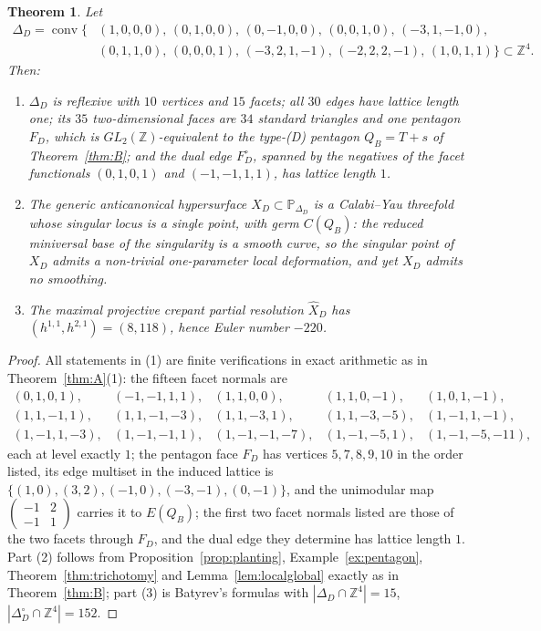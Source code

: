 \documentclass[11pt]{amsart}
\newtheorem{theorem}{Theorem}[section]
\theoremstyle{definition}
\theoremstyle{remark}
\newcommand{\ZZ}{\mathbb{Z}}
\newcommand{\PP}{\mathbb{P}}
\newcommand{\conv}{\operatorname{conv}}
\begin{document}
\begin{theorem}\label{thm:D}
Let
\begin{align*}
\Delta_D=\conv\{&(1,0,0,0),\,(0,1,0,0),\,(0,-1,0,0),\,(0,0,1,0),\,
(-3,1,-1,0),\\
&(0,1,1,0),\,(0,0,0,1),\,(-3,2,1,-1),\,(-2,2,2,-1),\,(1,0,1,1)\}
\subset\ZZ^4 .
\end{align*}
Then:
\begin{enumerate}
\item $\Delta_D$ is reflexive with $10$ vertices and $15$ facets; all $30$
edges have lattice length one; its $35$ two-dimensional faces are $34$
standard triangles and one pentagon $F_D$, which is
$GL_2(\ZZ)$-equivalent to the type-\textup{(D)} pentagon $Q_B = T + s$ of
Theorem~\textup{\ref{thm:B}}; and the dual edge $F_D^\circ$, spanned by the
negatives of the facet functionals $(0,1,0,1)$ and $(-1,-1,1,1)$, has
lattice length $1$.
\item The generic anticanonical hypersurface $X_D \subset \PP_{\Delta_D}$ is
a Calabi--Yau threefold whose singular locus is a \emph{single} point, with
germ $C(Q_B)$: the reduced miniversal base of the singularity is a smooth
curve, so the singular point of $X_D$ admits a non-trivial one-parameter
local deformation, and yet $X_D$ admits no smoothing.
\item The maximal projective crepant partial resolution $\widehat X_D$ has
$(h^{1,1},h^{2,1}) = (8,118)$, hence Euler number $-220$.
\end{enumerate}
\end{theorem}

\begin{proof}
All statements in (1) are finite verifications in exact arithmetic as in
Theorem~\ref{thm:A}(1): the fifteen facet normals are
\[
\begin{array}{lllll}
(0,1,0,1), & (-1,-1,1,1), & (1,1,0,0), & (1,1,0,-1), & (1,0,1,-1),\\[2pt]
(1,1,-1,1), & (1,1,-1,-3), & (1,1,-3,1), & (1,1,-3,-5), & (1,-1,1,-1),\\[2pt]
(1,-1,1,-3), & (1,-1,-1,1), & (1,-1,-1,-7), & (1,-1,-5,1), & (1,-1,-5,-11),
\end{array}
\]
each at level exactly $1$; the pentagon face $F_D$ has vertices
$5,7,8,9,10$ in the order listed, its edge multiset in the induced lattice
is $\{(1,0),(3,2),(-1,0),(-3,-1),(0,-1)\}$, and the unimodular map
$\left(\begin{smallmatrix}-1&2\\-1&1\end{smallmatrix}\right)$
carries it to $E(Q_B)$; the first two facet normals listed are those of the
two facets through $F_D$, and the dual edge they determine has lattice
length $1$.  Part (2) follows from
Proposition~\ref{prop:planting}, Example~\ref{ex:pentagon},
Theorem~\ref{thm:trichotomy} and Lemma~\ref{lem:localglobal} exactly as in
Theorem~\ref{thm:B}; part (3) is Batyrev's formulas with
$|\Delta_D\cap\ZZ^4| = 15$, $|\Delta_D^\circ\cap\ZZ^4| = 152$.
\end{proof}
\end{document}
